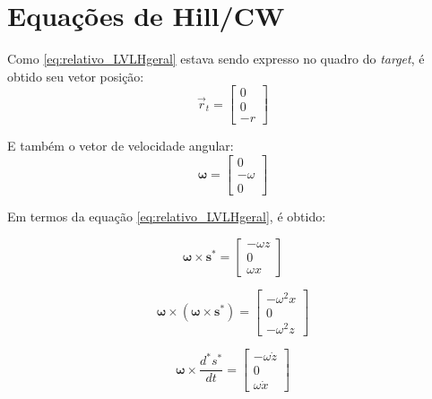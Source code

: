 
\section{Equações de Hill/CW}
Como \eqref{eq:relativo_LVLHgeral} estava sendo expresso no quadro do \emph{target}, é obtido seu vetor posição:
\begin{equation}
\label{eq:posicao_LVLH_target}
\vec r_t = \begin{bmatrix} 0 \\ 0 \\ -r \end{bmatrix}
\end{equation}

E também o vetor de velocidade angular:
\begin{equation}
\label{eq:velocidadeAngular_LVLH_target}
\boldsymbol\omega = \begin{bmatrix} 0 \\ -\omega \\ 0
\end{bmatrix}
\end{equation}

Em termos da equação \eqref{eq:relativo_LVLHgeral}, é obtido:

\begin{equation}
\label{eq:velAngular_cross_s}
\boldsymbol\omega \times \boldsymbol s^* =
\begin{bmatrix}
    -\omega z \\
    0         \\
    \omega x
\end{bmatrix} 
\end{equation}

\begin{equation}
\label{eq:velAngular_cross_cross_s}
\boldsymbol\omega \times (\boldsymbol\omega \times \boldsymbol s^*) =
\begin{bmatrix}
    -\omega^2 x \\
    0           \\
    -\omega^2 z 
\end{bmatrix}
\end{equation}

\begin{equation}
\label{eq:omega_cross_dsdt}
\boldsymbol\omega \times \frac{d^* s^*}{dt} =
\begin{bmatrix}
    -\omega \dot z \\
    0                 \\
    \omega \dot x
\end{bmatrix}
\end{equation}

